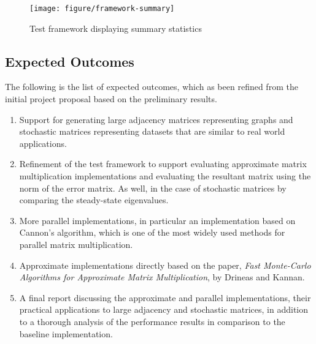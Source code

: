 \documentclass[oneside]{article}
\begin{document}
\begin{figure}[ht!]
\centering
\texttt{[image: figure/framework-summary]}
\caption{Test framework displaying summary statistics}
\label{fig:summary}
\end{figure}



\subsection{Expected Outcomes}

The following is the list of expected outcomes, which as been refined from the initial project proposal based on the preliminary results.

\begin{enumerate}
\item Support for generating large adjacency matrices representing graphs and stochastic matrices representing datasets that are similar to real world applications.

\item Refinement of the test framework to support evaluating approximate matrix multiplication implementations and evaluating the resultant matrix using the norm of the error matrix. As well, in the case of stochastic matrices by comparing the steady-state eigenvalues.

\item More parallel implementations, in particular an implementation based on Cannon's algorithm, which is one of the most widely used methods for parallel matrix multiplication.

\item Approximate implementations directly based on the paper, \emph{Fast Monte-Carlo Algorithms for Approximate Matrix Multiplication}\cite{drineas2001fast}, by Drineas and Kannan.

\item A final report discussing the approximate and parallel implementations, their practical applications to large adjacency and stochastic matrices, in addition to a thorough analysis of the performance results in comparison to the baseline implementation.

\end{enumerate}



\singlespacing

\end{document}
